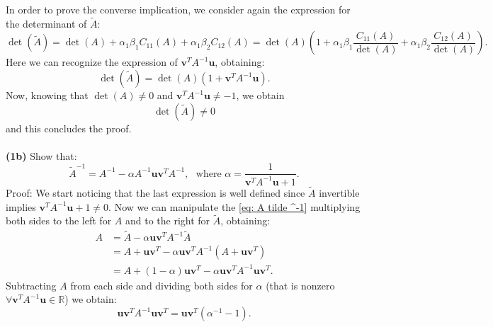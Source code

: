 \documentclass[a4paper]{report}
\newcommand{\R}{\mathbb{R}}
\numberwithin{equation}{chapter}
\begin{document}
\noindent In order to prove the converse implication, we consider again the expression for the determinant of $\tilde{A}$:
\begin{equation}\label{key}
	\det(\tilde{A}) = \det(A) + \alpha_1 \beta_1 C_{11}(A) + \alpha_1 \beta_2 C_{12}(A) = \det(A) \left( 1+ \alpha_1 \beta_1 \frac{C_{11}(A)}{\det(A)} + \alpha_1 \beta_2 \frac{C_{12}(A)}{\det(A)}\right).
\end{equation}
Here we can recognize the expression of $\textbf{v}^T A^{-1} \textbf{u}$, obtaining:
\begin{equation}\label{key}
	\det(\tilde{A}) = \det(A) (1 + \textbf{v}^T A^{-1} \textbf{u}).
\end{equation}
Now, knowing that $\det(A)\neq 0 $ and $\textbf{v}^T A^{-1} \textbf{u} \neq -1$, we obtain
\begin{equation}\label{key}
	\det(\tilde{A}) \neq 0
\end{equation}
and this concludes the proof.\\
\\
\noindent \textbf{(1b)} Show that:
\begin{equation}\label{eq: A tilde ^-1}
	\tilde{A}^{-1} = A^{-1}  - \alpha A^{-1} \textbf{u}\textbf{v}^T A^{-1},\ \ \ \text{where } \alpha = \frac{1}{\textbf{v}^T A^{-1}\textbf{u} + 1}.
\end{equation}
Proof: We start noticing that the last expression is well defined since $\tilde{A}$ invertible implies $\textbf{v}^T A^{-1} \textbf{u} + 1 \neq 0$. Now we can manipulate the \eqref{eq: A tilde ^-1} multiplying both sides to the left for $A$ and to the right for $\tilde{A}$, obtaining:
\begin{equation}\label{key}
\begin{split}
	A &= \tilde{A} - \alpha \textbf{u} \textbf{v}^T A^{-1} \tilde{A} \\
	&= A + \textbf{u}\textbf{v}^T - \alpha \textbf{u} \textbf{v}^T A^{-1} (A + \textbf{u}\textbf{v}^T )\\
	&= A + (1-\alpha) \textbf{u}\textbf{v}^T - \alpha \textbf{u}\textbf{v}^TA^{-1} \textbf{u}\textbf{v}^T.
\end{split}
\end{equation}
Subtracting $A$ from each side and dividing both sides for $\alpha$ (that is nonzero $\forall \textbf{v}^T A^{-1}\textbf{u} \in \R$) we obtain:
\begin{equation}\label{eq: identity theorem 1b}
	\textbf{u}\textbf{v}^T A^{-1} \textbf{u}\textbf{v}^T = \textbf{u}\textbf{v}^T(\alpha^{-1}-1).
\end{equation}
\end{document}
